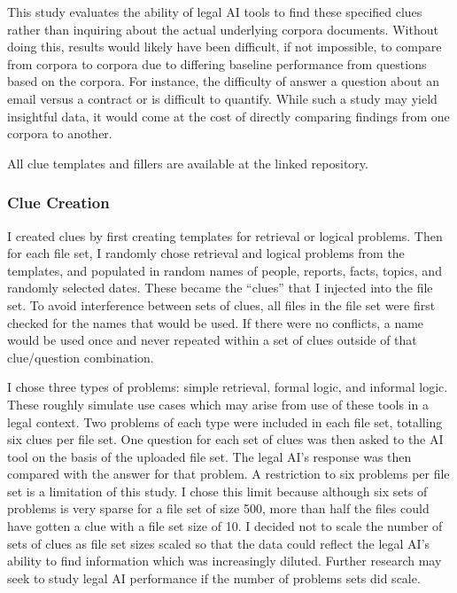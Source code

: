 \documentclass[
]{article}
\begin{document}
This study evaluates the ability of legal AI tools to find these specified clues rather than inquiring about the actual underlying corpora documents. Without doing this, results would likely have been difficult, if not impossible, to compare from corpora to corpora due to differing baseline performance from questions based on the corpora. For instance, the difficulty of answer a question about an email versus a contract or is difficult to quantify. While such a study may yield insightful data, it would come at the cost of directly comparing findings from one corpora to another.

All clue templates and fillers are available at the linked repository.

\subsubsection{Clue Creation}\label{clue-creation}

I created clues by first creating templates for retrieval or logical problems. Then for each file set, I randomly chose retrieval and logical problems from the templates, and populated in random names of people, reports, facts, topics, and randomly selected dates. These became the ``clues'' that I injected into the file set. To avoid interference between sets of clues, all files in the file set were first checked for the names that would be used. If there were no conflicts, a name would be used once and never repeated within a set of clues outside of that clue/question combination.

I chose three types of problems: simple retrieval, formal logic, and informal logic. These roughly simulate use cases which may arise from use of these tools in a legal context. Two problems of each type were included in each file set, totalling six clues per file set. One question for each set of clues was then asked to the AI tool on the basis of the uploaded file set. The legal AI's response was then compared with the answer for that problem. A restriction to six problems per file set is a limitation of this study. I chose this limit because although six sets of problems is very sparse for a file set of size 500, more than half the files could have gotten a clue with a file set size of 10. I decided not to scale the number of sets of clues as file set sizes scaled so that the data could reflect the legal AI's ability to find information which was increasingly diluted. Further research may seek to study legal AI performance if the number of problems sets did scale.
\end{document}
